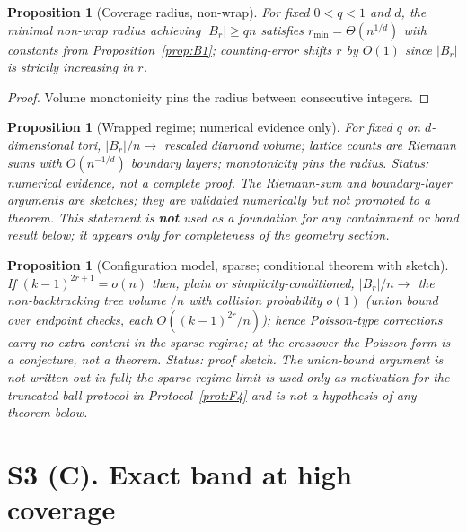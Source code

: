 \documentclass[preprint,12pt]{elsarticle}
\newtheorem{proposition}[theorem]{Proposition}
\begin{document}
\begin{proposition}[Coverage radius, non-wrap]
\label{prop:B3}
For fixed $0<q<1$ and $d$, the minimal non-wrap radius achieving
$|B_r|\ge qn$ satisfies $r_{\min}=\Theta(n^{1/d})$ with constants from
Proposition~\ref{prop:B1}; counting-error shifts $r$ by $O(1)$ since
$|B_r|$ is strictly increasing in $r$.
\end{proposition}
\begin{proof}
Volume monotonicity pins the radius between consecutive integers.
\end{proof}

\begin{proposition}[Wrapped regime; numerical evidence only]
\label{prop:B4}
For fixed $q$ on $d$-dimensional tori, $|B_r|/n\to$ rescaled diamond
volume; lattice counts are Riemann sums with $O(n^{-1/d})$ boundary
layers; monotonicity pins the radius. \emph{Status: numerical evidence,
not a complete proof.} The Riemann-sum and boundary-layer arguments are
sketches; they are validated numerically but not promoted to a theorem.
This statement is \textbf{not} used as a foundation for any containment
or band result below; it appears only for completeness of the geometry
section.
\end{proposition}

\begin{proposition}[Configuration model, sparse; conditional theorem with sketch]
\label{prop:B5}
If $(k-1)^{2r+1}=o(n)$ then, plain or simplicity-conditioned,
$|B_r|/n\to$ the non-backtracking tree volume $/n$ with collision
probability $o(1)$ (union bound over endpoint checks, each
$O((k-1)^{2r}/n)$); hence Poisson-type corrections carry no extra
content in the sparse regime; at the crossover the Poisson form is a
\emph{conjecture}, not a theorem. \emph{Status: proof sketch.} The
union-bound argument is not written out in full; the sparse-regime
limit is used only as motivation for the truncated-ball protocol in
Protocol~\ref{prot:F4} and is not a hypothesis of any theorem below.
\end{proposition}

\section{S3 (C). Exact band at high coverage}
\label{sec:C}

\setcounter{theorem}{-1}%
\end{document}
